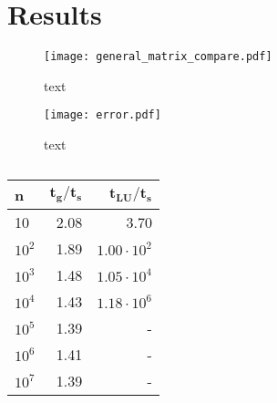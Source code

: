 \section{Results}
\label{sec:results}


%
%

\begin{figure}[htbp]
	\centering
	\texttt{[image: general\_matrix\_compare.pdf]}
	\label{fig:compare}
	\caption{text}
\end{figure}

\begin{figure}[htbp]
	\centering
	\texttt{[image: error.pdf]}
	\label{fig:error}
	\caption{text}
\end{figure}

\begin{table}[htbp]
	\centering
	\begin{tabular}{lrr}
		\textbf{n} & $\mathbf{{t_g}/{t_s}}$ & $\mathbf{{t_{LU}}/{t_s}}$  \\
		\midrule
		\addlinespace[0.1cm]
		
		10         & 2.08                                                                                          & 3.70                                                                                        \\
		$10^2$       & 1.89                                                                                          & $1.00\cdot 10^2 $                                                                                         \\
		$10^3$       & 1.48                                                                                          & $1.05 \cdot 10^4 $                                                                                        \\
		$10^4$       & 1.43                                                                                          & $1.18 \cdot 10^6$                                                                                         \\
		$10^5$       & 1.39                                                                                          & -                                                                                         \\
		$10^6$       & 1.41                                                                                          & -                                                                                        \\
		$10^7$       & 1.39                                                                                          &    -                                                                                    
	\end{tabular} \label{table:time} \caption{}
\end{table} 